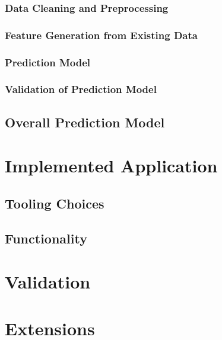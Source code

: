 \documentclass[%
a4paper,
DIV12,
2.5headlines,
bigheadings,
titlepage,
openbib,
]{scrartcl}
\begin{document}
\subsubsection{Data Cleaning and
Preprocessing}\label{data-cleaning-and-preprocessing-2}



\subsubsection{Feature Generation from Existing
Data}\label{feature-generation-from-existing-data-1}



\subsubsection{Prediction Model}\label{prediction-model-2}



\subsubsection{Validation of Prediction
Model}\label{validation-of-prediction-model-2}



\subsection{Overall Prediction Model}\label{overall-prediction-model}



\section{Implemented Application}\label{implemented-application}
\subsection{Tooling Choices}\label{tooling-choices}



\subsection{Functionality}\label{functionality}



\section{Validation}\label{validation}



\section{Extensions}\label{extensions}
\end{document}
